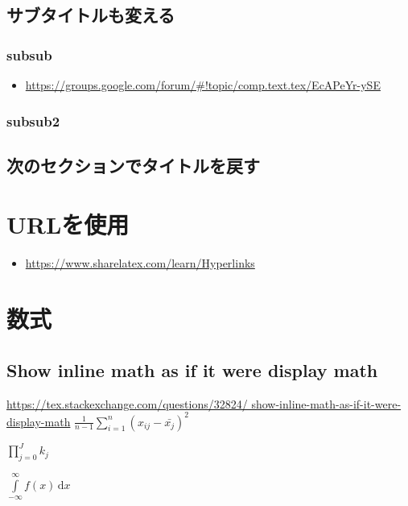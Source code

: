 \documentclass{jsarticle}           %
\renewcommand\thesection{\arabic{section}}
\renewcommand\thesubsection{\thesection.\arabic{subsection}}
\theoremstyle{plain}
\theoremstyle{definition}
\theoremstyle{remark}
\begin{document}
\subsection{サブタイトルも変える}
\subsubsection{subsub}
\begin{itemize}
  \item \url{
        https://groups.google.com/forum/#!topic/comp.text.tex/EcAPeYr-ySE}
\end{itemize}
\subsubsection*{subsub2}
\subsection{次のセクションでタイトルを戻す}

\let\thesection=\oldthesection
\let\thesubsection=\oldthesubsection
\section{URLを使用}
\begin{itemize}
  \item \url{https://www.sharelatex.com/learn/Hyperlinks}
\end{itemize}
    
\section{数式} \label{数式}
\subsection{Show inline math as if it were display math}
\url{https://tex.stackexchange.com/questions/32824/
show-inline-math-as-if-it-were-display-math}
$\frac{1}{n-1} \sum\limits_{i=1}^{n} (x_{ij} - \bar{x_j})^2$
            
$\prod\limits_{j=0}^J k_j$
            
$\int\limits_{-\infty}^\infty f(x)\,\mathrm{d}x$
            
\end{document}
